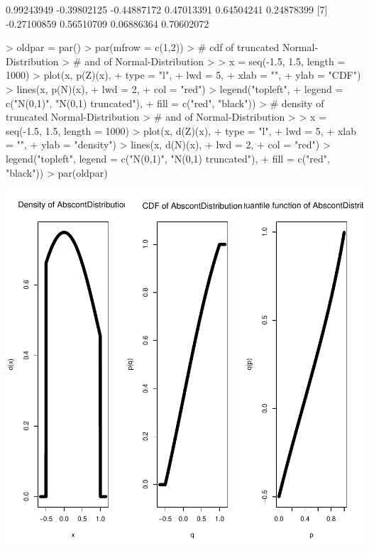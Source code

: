 \documentclass[11pt]{article}
\begin{document}
\begin{Schunk}
\begin{Soutput}
 [1]  0.99243949 -0.39802125 -0.44887172  0.47013391  0.64504241  0.24878399
 [7] -0.27100859  0.56510709  0.06886364  0.70602072
\end{Soutput}
\begin{Sinput}
> oldpar = par()
> par(mfrow = c(1,2))
> # cdf of truncated Normal-Distribution
> # and of Normal-Distribution
> 
> x = seq(-1.5, 1.5, length = 1000)
> plot(x, p(Z)(x),
+      type = "l",
+      lwd = 5,
+      xlab = "",
+      ylab = "CDF")
> lines(x, p(N)(x),
+       lwd = 2,
+       col = "red")
> legend("topleft",
+        legend = c("N(0,1)", "N(0,1) truncated"),
+        fill = c("red", "black"))
> # density of truncated Normal-Distribution
> # and of Normal-Distribution
> 
> x = seq(-1.5, 1.5, length = 1000)
> plot(x, d(Z)(x),
+      type = "l",
+      lwd = 5,
+      xlab = "",
+      ylab = "density")
> lines(x, d(N)(x),
+       lwd = 2,
+       col = "red")
> legend("topleft", legend = c("N(0,1)", "N(0,1) truncated"),
+        fill = c("red", "black"))
> par(oldpar)
\end{Sinput}
\end{Schunk}
\includegraphics{distr-truncate}
\end{document}
